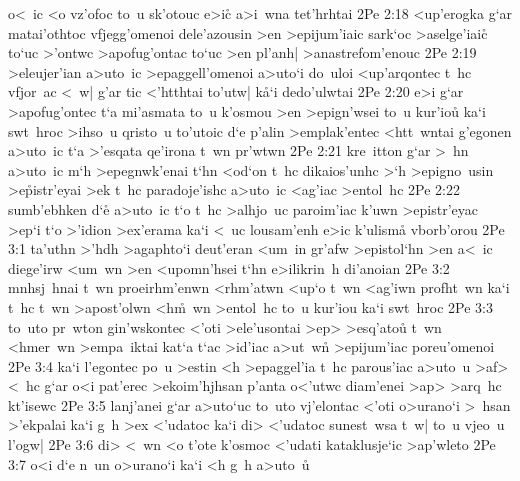 o<~ic
<o
vz'ofoc
to~u
sk'otouc
e>ic\r{}
a>i~wna
tet'hrhtai\bibvsend
\vs 2Pe 2:18
<up'erogka
g`ar
matai'othtoc
vfjegg'omenoi
dele'azousin
>en
>epijum'iaic
sark`oc
>aselge'iaic\r{}
to`uc
>'ontwc
>apofug'ontac
to`uc
>en
pl'anh|
>anastrefom'enouc\bibvsend
\vs 2Pe 2:19
>eleujer'ian
a>uto~ic
>epaggell'omenoi
a>uto`i
do~uloi
<up'arqontec
t~hc
vfjor~ac
<~w|
g'ar
tic
<'htthtai
to'utw|
k\r{a}`i
dedo'ulwtai\bibvsend
\vs 2Pe 2:20
e>i
g`ar
>apofug'ontec
t`a
mi'asmata
to~u
k'osmou
>en
>epign'wsei
to~u
kur'io\r{u}
ka`i
swt~hroc
>ihso~u
qristo~u
to'utoic
d`e
p'alin
>emplak'entec
<htt~wntai
g'egonen
a>uto~ic
t`a
>'esqata
qe'irona
t~wn
pr'wtwn\bibvsend
\vs 2Pe 2:21
kre~itton
g`ar
>~hn
a>uto~ic
m`h
>epegnwk'enai
t`hn
<od`on
t~hc
dikaios'unhc
>`h
>epigno~usin
>e\r{p}istr'eyai
>ek
t~hc
paradoje'ishc
a>uto~ic
<ag'iac
>entol~hc\bibvsend
\vs 2Pe 2:22
sumb'ebhken
d`e\r{}
a>uto~ic
t`o
t~hc
>alhjo~uc
paroim'iac
k'uwn
>epistr'eyac
>ep`i
t`o
>'idion
>ex'erama
ka`i
<~uc
lousam'enh
e>ic
k'ulism\r{a}
vborb'orou\bibvsend
\vs 2Pe 3:1
ta'uthn
>'hdh
>agaphto`i
deut'eran
<um~in
gr'afw
>epistol`hn
>en
a<~ic
diege'irw
<um~wn
>en
<upomn'hsei
t`hn
e>ilikrin~h
di'anoian\bibvsend
\vs 2Pe 3:2
mnhsj~hnai
t~wn
proeirhm'enwn
<rhm'atwn
<up`o
t~wn
<ag'iwn
profht~wn
ka`i
t~hc
t~wn
>apost'olwn
<h\r{m}~wn
>entol~hc
to~u
kur'iou
ka`i
swt~hroc\bibvsend
\vs 2Pe 3:3
to~uto
pr~wton
gin'wskontec
<'oti
>ele'usontai
>ep>
>esq'atou\r{}
t~wn
<hmer~wn
>empa~iktai
kat`a
t`ac
>id'iac
a>ut~wn\r{}
>epijum'iac
poreu'omenoi\bibvsend
\vs 2Pe 3:4
ka`i
l'egontec
po~u
>estin
<h
>epaggel'ia
t~hc
parous'iac
a>uto~u
>af>
<~hc
g`ar
o<i
pat'erec
>ekoim'hjhsan
p'anta
o<'utwc
diam'enei
>ap>
>arq~hc
kt'isewc\bibvsend
\vs 2Pe 3:5
lanj'anei
g`ar
a>uto`uc
to~uto
vj'elontac
<'oti
o>urano`i
>~hsan
>'ekpalai
ka`i
g~h
>ex
<'udatoc
ka`i
di>
<'udatoc
sunest~wsa
t~w|
to~u
vjeo~u
l'ogw|\bibvsend
\vs 2Pe 3:6
di>
<~wn
<o
t'ote
k'osmoc
<'udati
kataklusje`ic
>ap'wleto\bibvsend
\vs 2Pe 3:7
o<i
d`e
n~un
o>urano`i
ka`i
<h
g~h
a>uto~u\r{}

